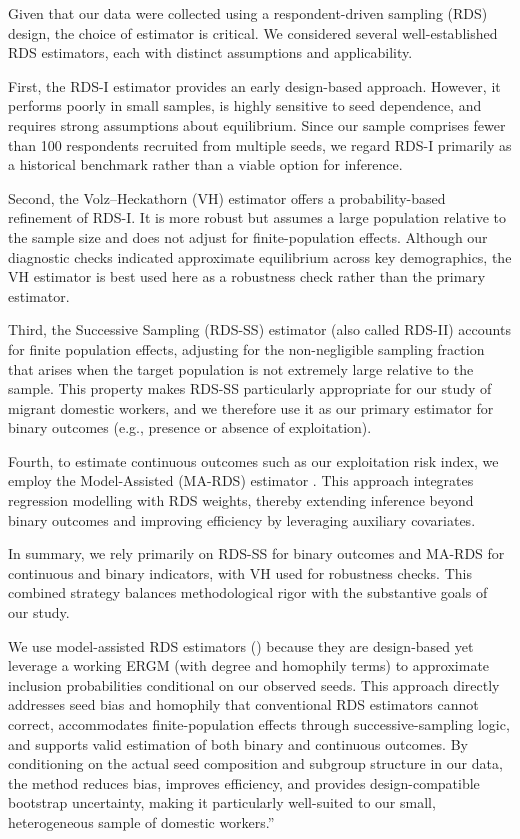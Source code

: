 \documentclass[
  12pt,
  letterpaper,
  DIV=11,
  numbers=noendperiod]{scrartcl}
\theoremstyle{plain}
\theoremstyle{definition}
\begin{document}
Given that our data were collected using a respondent-driven sampling
(RDS) design, the choice of estimator is critical. We considered several
well-established RDS estimators, each with distinct assumptions and
applicability.

First, the RDS-I estimator \textcite{salg04-samplin} provides an early
design-based approach. However, it performs poorly in small samples, is
highly sensitive to seed dependence, and requires strong assumptions
about equilibrium. Since our sample comprises fewer than 100 respondents
recruited from multiple seeds, we regard RDS-I primarily as a historical
benchmark rather than a viable option for inference.

Second, the Volz--Heckathorn (VH) estimator \textcite{volz08-probabi}
offers a probability-based refinement of RDS-I. It is more robust but
assumes a large population relative to the sample size and does not
adjust for finite-population effects. Although our diagnostic checks
indicated approximate equilibrium across key demographics, the VH
estimator is best used here as a robustness check rather than the
primary estimator.

Third, the Successive Sampling (RDS-SS) estimator (also called RDS-II)
\textcite{gile11-improve} accounts for finite population effects,
adjusting for the non-negligible sampling fraction that arises when the
target population is not extremely large relative to the sample. This
property makes RDS-SS particularly appropriate for our study of migrant
domestic workers, and we therefore use it as our primary estimator for
binary outcomes (e.g., presence or absence of exploitation).

Fourth, to estimate continuous outcomes such as our exploitation risk
index, we employ the Model-Assisted (MA-RDS) estimator
\textcite{gile15-network}. This approach integrates regression modelling
with RDS weights, thereby extending inference beyond binary outcomes and
improving efficiency by leveraging auxiliary covariates.

In summary, we rely primarily on RDS-SS for binary outcomes and MA-RDS
for continuous and binary indicators, with VH used for robustness
checks. This combined strategy balances methodological rigor with the
substantive goals of our study.

We use model-assisted RDS estimators (\textcite{gile15-network}) because
they are design-based yet leverage a working ERGM (with degree and
homophily terms) to approximate inclusion probabilities conditional on
our observed seeds. This approach directly addresses seed bias and
homophily that conventional RDS estimators cannot correct, accommodates
finite-population effects through successive-sampling logic, and
supports valid estimation of both binary and continuous outcomes. By
conditioning on the actual seed composition and subgroup structure in
our data, the method reduces bias, improves efficiency, and provides
design-compatible bootstrap uncertainty, making it particularly
well-suited to our small, heterogeneous sample of domestic workers.''
\end{document}
